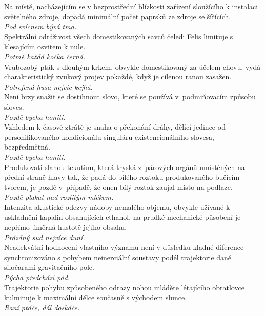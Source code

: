 \begin{multicols}{\value{columnsgames}}
\noindent
Na místě, nacházejícím se v bezprostřední blízkosti zařízení
sloužícího k instalaci světelného zdroje, dopadá minimální počet
paprsků ze zdroje se šířících.\\[1 mm]
{\sl Pod svícnem bývá tma.}\\

\noindent
Spektrální odráživost všech domestikovaných savců čeledi
Felis limituje s klesajícím osvitem k nule.\\[1 mm]
{\sl Potmě každá kočka černá.}\\

\noindent
Vrubozobý pták s dlouhým krkem, obvykle domestikovaný za
účelem chovu, vydá charakteristický zvukový projev pokaždé,
když je cílenou ranou zasažen.\\[1 mm]
{\sl Potrefená husa nejvíc kejhá.}\\

\noindent
Není brzy snažit se dostihnout slovo, které se používá v~podmiňovacím
způsobu sloves.\\[1 mm]
{\sl Pozdě bycha honiti.}\\

\noindent
Vzhledem k časové ztrátě je snaha o překonání dráhy, dělící
jedince od personifikovaného kondicionálu singuláru existencionálního
slovesa, bezpředmětná.\\[1 mm]
{\sl Pozdě bycha honiti.}\\

\noindent
Produkovati slanou tekutinu, která tryská z~párových orgánů
umístěných na přední straně hlavy tak, že padá do bílého roztoku
produkovaného bučícím tvorem, je pozdě v~případě, že onen bílý
roztok zaujal místo na podlaze.\\[1 mm]
{\sl Pozdě plakat nad rozlitým mlékem.}\\

\noindent
Intenzita akustické odezvy nádoby nemalého objemu, obvykle
užívané k uskladnění kapalin obsahujících ethanol, na prudké
mechanické působení je nepřímo úměrná hustotě jejího obsahu.\\[1 mm]
{\sl Prázdný sud nejvíce duní.}\\

\noindent
Neadekvátní hodnoceni vlastního významu není v důsledku kladné
diference synchronizováno s pohybem neinerciální soustavy podél
trajektorie dané siločarami gravitačního pole.\\[1 mm]
{\sl Pýcha předchází pád.}\\

\noindent
Trajektorie pohybu způsobeného odrazy nohou mláděte létajícího
obratlovce kulminuje k maximální délce současně s východem slunce.\\[1 mm]
{\sl Raní ptáče, dál doskáče.}\\


\end{multicols}
